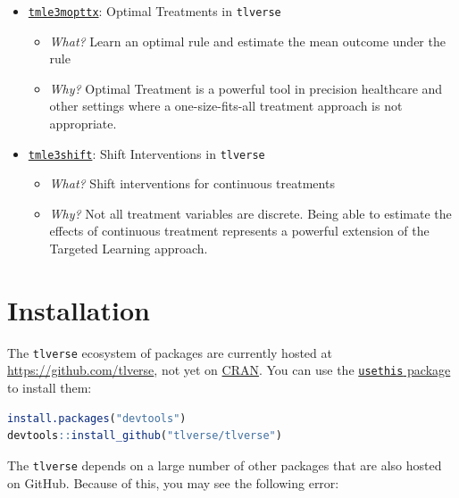 \documentclass[12pt, krantz2,]{krantz}
\newcommand{\passthrough}[1]{#1}
\providecommand{\tightlist}{%
  \setlength{\itemsep}{0pt}\setlength{\parskip}{0pt}}
\theoremstyle{definition}
\theoremstyle{definition}
\theoremstyle{definition}
\newcommand{\1}{\mathbbm{1}}
\begin{document}
\begin{itemize}
\tightlist
\item
  \href{https://github.com/tlverse/tmle3mopttx}{\passthrough{\lstinline!tmle3mopttx!}}: Optimal Treatments
  in \passthrough{\lstinline!tlverse!}

  \begin{itemize}
  \tightlist
  \item
    \emph{What?} Learn an optimal rule and estimate the mean outcome under the rule
  \item
    \emph{Why?} Optimal Treatment is a powerful tool in precision healthcare and
    other settings where a one-size-fits-all treatment approach is not
    appropriate.
  \end{itemize}
\item
  \href{https://github.com/tlverse/tmle3shift}{\passthrough{\lstinline!tmle3shift!}}: Shift Interventions in
  \passthrough{\lstinline!tlverse!}

  \begin{itemize}
  \tightlist
  \item
    \emph{What?} Shift interventions for continuous treatments
  \item
    \emph{Why?} Not all treatment variables are discrete. Being able to estimate the
    effects of continuous treatment represents a powerful extension of the
    Targeted Learning approach.
  \end{itemize}
\end{itemize}

\hypertarget{installtlverse}{%
\section{Installation}\label{installtlverse}}

The \passthrough{\lstinline!tlverse!} ecosystem of packages are currently hosted at
\url{https://github.com/tlverse}, not yet on \href{https://CRAN.R-project.org/}{CRAN}. You
can use the \href{https://usethis.r-lib.org/}{\passthrough{\lstinline!usethis!} package} to install them:

\begin{lstlisting}[language=R]
install.packages("devtools")
devtools::install_github("tlverse/tlverse")
\end{lstlisting}

The \passthrough{\lstinline!tlverse!} depends on a large number of other packages that are also hosted
on GitHub. Because of this, you may see the following error:
\end{document}
